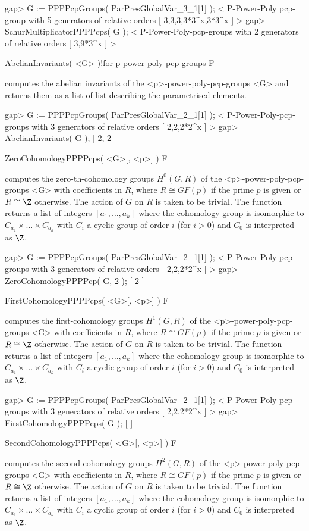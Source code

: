 \beginexample
gap> G := PPPPcpGroups( ParPresGlobalVar_3_1[1] );
< P-Power-Poly pcp-group with 5 generators of relative orders [ 3,3,3,3*3^x,3*3^x ] >
gap> SchurMultiplicatorPPPPcps( G );
< P-Power-Poly-pcp-groups with 2 generators of relative orders [ 3,9*3^x ] >
\endexample

\>AbelianInvariants( <G> )!{for p-power-poly-pcp-groups} F

computes the abelian invariants of the <p>-power-poly-pcp-groups <G> and returns
them as a list of list describing the parametrised elements.

\beginexample
gap> G := PPPPcpGroups( ParPresGlobalVar_2_1[1] );
< P-Power-Poly-pcp-groups with 3 generators of relative orders [ 2,2,2*2^x ] >
gap> AbelianInvariants( G );
[ 2, 2 ]
\endexample

\>ZeroCohomologyPPPPcps( <G>[, <p>] ) F

computes the zero-th-cohomology groups $H^0(G,R)$ of the 
<p>-power-poly-pcp-groups <G> with coefficients in $R$, where $R \cong GF(p)$ if
the prime $p$ is given or $R \cong \Z$ otherwise. The action of $G$ on $R$ is
taken to be trivial. The function returns a list of integers $[a_1,\ldots,
a_k]$ where the cohomology group is isomorphic to $C_{a_1} \times \ldots 
\times C_{a_k}$ with $C_i$ a cyclic group of order $i$ (for $i > 0$) and $C_0$ 
is interpreted as $\Z$.

\beginexample
gap> G := PPPPcpGroups( ParPresGlobalVar_2_1[1] );
< P-Power-Poly-pcp-groups with 3 generators of relative orders [ 2,2,2*2^x ] >
gap> ZeroCohomologyPPPPcp( G, 2 );
[ 2 ]
\endexample

\>FirstCohomologyPPPPcps( <G>[, <p>] ) F

computes the first-cohomology groups $H^1(G,R)$ of the 
<p>-power-poly-pcp-groups <G> with coefficients in $R$, where $R \cong GF(p)$ if
the prime $p$ is given or $R \cong \Z$ otherwise. The action of $G$ on $R$ is
taken to be trivial. The function returns a list of integers $[a_1,\ldots,
a_k]$ where the cohomology group is isomorphic to $C_{a_1} \times \ldots 
\times C_{a_k}$ with $C_i$ a cyclic group of order $i$ (for $i > 0$) and $C_0$ 
is interpreted as $\Z$.

\beginexample
gap> G := PPPPcpGroups( ParPresGlobalVar_2_1[1] );
< P-Power-Poly-pcp-groups with 3 generators of relative orders [ 2,2,2*2^x ] >
gap> FirstCohomologyPPPPcps( G );
[  ]
\endexample

\>SecondCohomologyPPPPcps( <G>[, <p>] ) F

computes the second-cohomology groups $H^2(G,R)$ of the 
<p>-power-poly-pcp-groups <G> with coefficients in $R$, where $R \cong GF(p)$ if
the prime $p$ is given or $R \cong \Z$ otherwise. The action of $G$ on $R$ is
taken to be trivial. The function returns a list of integers $[a_1,\ldots,
a_k]$ where the cohomology group is isomorphic to $C_{a_1} \times \ldots 
\times C_{a_k}$ with $C_i$ a cyclic group of order $i$ (for $i > 0$) and $C_0$ 
is interpreted as $\Z$.

